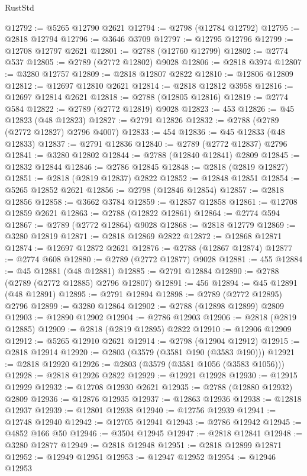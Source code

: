 \begin{lexlean}{RustStd}
\begin{coremodule}
@12792 := @5265 @12790 @2621
@12794 := @2798 (@12784 @12792)
@12795 := @2818 @12794
@12796 := @3646 @3709
@12797 := @12795 @12796
@12799 := @12708 @12797 @2621
@12801 := @2788 (@12760 @12799)
@12802 := @2774 @537
@12805 := @2789 (@2772 @12802) @9028
@12806 := @2818 @3974
@12807 := @3280 @12757
@12809 := @2818 @12807 @2822
@12810 := @12806 @12809
@12812 := @12697 @12810 @2621
@12814 := @2818 @12812 @3958
@12816 := @12697 @12814 @2621
@12818 := @2788 (@12805 @12816)
@12819 := @2774 @584
@12822 := @2789 (@2772 @12819) @9028
@12823 := 453
@12826 := @45 @12823 (@48 @12823)
@12827 := @2791 @12826
@12832 := @2788 (@2789 (@2772 @12827) @2796 @4007)
@12833 := 454
@12836 := @45 @12833 (@48 @12833)
@12837 := @2791 @12836
@12840 := @2789 (@2772 @12837) @2796
@12841 := @3280 @12802
@12844 := @2788 (@12840 @12841) @2809
@12845 := @12832 @12844
@12846 := @2786 @12845
@12848 := @2818 (@2819 @12827)
@12851 := @2818 (@2819 @12837) @2822
@12852 := @12848 @12851
@12854 := @5265 @12852 @2621
@12856 := @2798 (@12846 @12854)
@12857 := @2818 @12856
@12858 := @3662 @3784
@12859 := @12857 @12858
@12861 := @12708 @12859 @2621
@12863 := @2788 (@12822 @12861)
@12864 := @2774 @594
@12867 := @2789 (@2772 @12864) @9028
@12868 := @2818 @12779
@12869 := @3280 @12819
@12871 := @2818 @12869 @2822
@12872 := @12868 @12871
@12874 := @12697 @12872 @2621
@12876 := @2788 (@12867 @12874)
@12877 := @2774 @608
@12880 := @2789 (@2772 @12877) @9028
@12881 := 455
@12884 := @45 @12881 (@48 @12881)
@12885 := @2791 @12884
@12890 := @2788 (@2789 (@2772 @12885) @2796 @12807)
@12891 := 456
@12894 := @45 @12891 (@48 @12891)
@12895 := @2791 @12894
@12898 := @2789 (@2772 @12895) @2796
@12899 := @3280 @12864
@12902 := @2788 (@12898 @12899) @2809
@12903 := @12890 @12902
@12904 := @2786 @12903
@12906 := @2818 (@2819 @12885)
@12909 := @2818 (@2819 @12895) @2822
@12910 := @12906 @12909
@12912 := @5265 @12910 @2621
@12914 := @2798 (@12904 @12912)
@12915 := @2818 @12914
@12920 := @2803 (@3579 (@3581 @190 (@3583 @190)))
@12921 := @2818 @12920
@12926 := @2803 (@3579 (@3581 @1056 (@3583 @1056)))
@12928 := @2818 @12926 @2822
@12929 := @12921 @12928
@12930 := @12915 @12929
@12932 := @12708 @12930 @2621
@12935 := @2788 (@12880 @12932) @2809
@12936 := @12876 @12935
@12937 := @12863 @12936
@12938 := @12818 @12937
@12939 := @12801 @12938
@12940 := @12756 @12939
@12941 := @12748 @12940
@12942 := @12705 @12941
@12943 := @2786 @12942
@12945 := @4852 @166 @50
@12946 := @3504 @12945
@12947 := @2818 @12841
@12948 := @3280 @12877
@12949 := @2818 @12948
@12951 := @2818 @12899 @12871
@12952 := @12949 @12951
@12953 := @12947 @12952
@12954 := @12946 @12953

\end{coremodule}
\end{lexlean}
